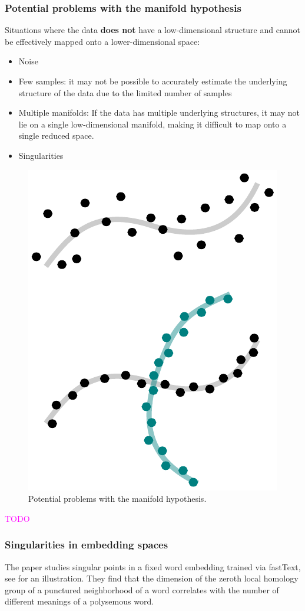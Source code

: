 \documentclass[11pt, a4paper]{amsart}
\begin{document}
\subsubsection{Potential problems with the manifold hypothesis}

Situations where the data \textbf{does not} have a low-dimensional structure and cannot be effectively mapped onto a lower-dimensional space:
\begin{itemize}
	\item Noise
	\item Few samples:
	it may not be possible to accurately estimate the underlying structure of the data due to the limited number of samples
	\item Multiple manifolds:
	If the data has multiple underlying structures, it may not lie on a single low-dimensional manifold, making it difficult to map onto a single reduced space.
	\item Singularities
\end{itemize}


\begin{figure}
	\centering
	\includegraphics[width=0.35\linewidth]{figures/topological_data_analysis/manifold_hypothesis_problems.pdf}
	\caption{
		Potential problems with the manifold hypothesis.
		\label{fig:manifold_hypothesis_problems}
	}
\end{figure}

\textcolor{magenta}{TODO}

\subsubsection{Singularities in embedding spaces}

The paper \cite{jakubowski2020topology} studies singular points in a fixed word embedding trained via fastText, see  for an illustration.
They find that the dimension of the zeroth local homology group of a punctured neighborhood of a word correlates with the number of different meanings of a polysemous word.
\end{document}
